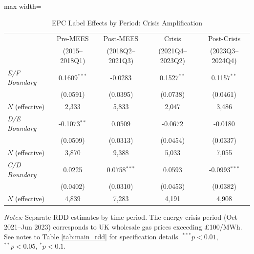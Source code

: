 \begin{table}[htbp]
\centering
\caption{EPC Label Effects by Period: Crisis Amplification}
\label{tab:crisis}
\begin{adjustbox}{max width=\textwidth}
\begin{tabular}{lcccc}
\toprule
 & Pre-MEES & Post-MEES & Crisis & Post-Crisis \\
 & (2015--2018Q1) & (2018Q2--2021Q3) & (2021Q4--2023Q2) & (2023Q3--2024Q4) \\
\midrule
\textit{E/F Boundary} & 0.1609$^{***}$ & -0.0283 & 0.1527$^{**}$ & 0.1157$^{**}$ \\
 & (0.0591) & (0.0395) & (0.0738) & (0.0461) \\
\quad $N$ (effective) & 2,333 & 5,833 & 2,047 & 3,486 \\
\addlinespace
\textit{D/E Boundary} & -0.1073$^{**}$ & 0.0509 & -0.0672 & -0.0180 \\
 & (0.0509) & (0.0313) & (0.0454) & (0.0337) \\
\quad $N$ (effective) & 3,870 & 9,388 & 5,033 & 7,055 \\
\addlinespace
\textit{C/D Boundary} & 0.0225 & 0.0758$^{***}$ & 0.0593 & -0.0993$^{***}$ \\
 & (0.0402) & (0.0310) & (0.0453) & (0.0382) \\
\quad $N$ (effective) & 4,839 & 7,283 & 4,191 & 4,908 \\
\bottomrule
\end{tabular}
\end{adjustbox}
\begin{minipage}{\textwidth}
\footnotesize
\textit{Notes:} Separate RDD estimates by time period.
The energy crisis period (Oct 2021--Jun 2023) corresponds to UK wholesale gas prices exceeding \pounds100/MWh.
See notes to Table \ref{tab:main_rdd} for specification details.
$^{***}p<0.01$, $^{**}p<0.05$, $^{*}p<0.1$.
\end{minipage}
\end{table}

